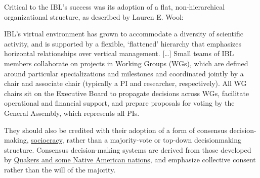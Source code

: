 Critical to the IBL's success was its adoption of a flat,
non-hierarchical organizational structure, as described by Lauren E.
Wool:

\begin{leftbar}
IBL's virtual environment has grown to accommodate a diversity of
scientific activity, and is supported by a flexible, `flattened'
hierarchy that emphasizes horizontal relationships over vertical
management. {[}\ldots{]} Small teams of IBL members collaborate on
projects in Working Groups (WGs), which are defined around particular
specializations and milestones and coordinated jointly by a chair and
associate chair (typically a PI and researcher, respectively). All WG
chairs sit on the Executive Board to propagate decisions across WGs,
facilitate operational and financial support, and prepare proposals for
voting by the General Assembly, which represents all PIs. \citep{woolKnowledgeNetworksHow2020} 
\end{leftbar}

They should also be credited with their adoption of a form of consensus
decision-making, \href{https://sociocracy.info}{sociocracy}, rather than
a majority-vote or top-down decisionmaking structure. Consensus
decision-making systems are derived from those developed by
\href{https://rhizomenetwork.wordpress.com/2011/06/18/a-brief-history-of-consenus-decision-making/}{Quakers
and some Native American nations}, and emphasize collective consent
rather than the will of the majority.

